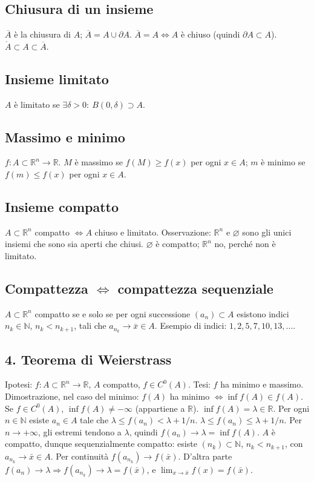 \documentclass[11pt,a4paper]{article}
\newcommand{\R}{\mathbb R}\newcommand{\N}{\mathbb N}\newcommand{\pagina}[1]{\clearpage}
\begin{document}
\subsection*{Chiusura di un insieme}
$\overline A$ è la chiusura di $A$; $\overline A=A\cup\partial A$.
$\overline A=A\iff A$ è chiuso (quindi $\partial A\subset A$).
$\mathring A\subset A\subset\overline A$.
\subsection*{Insieme limitato}
$A$ è limitato se $\exists\delta>0:\ B(0,\delta)\supset A$.
\begin{center}\end{center}
\pagina{16}
\subsection*{Massimo e minimo}
$f:A\subset\R^n\to\R$. $M$ è massimo se $f(M)\ge f(x)$ per ogni $x\in A$; $m$ è minimo se $f(m)\le f(x)$ per ogni $x\in A$.
\subsection*{Insieme compatto}
$A\subset\R^n$ compatto $\iff A$ chiuso e limitato.
Osservazione: $\R^n$ e $\varnothing$ sono gli unici insiemi che sono sia aperti che chiusi. $\varnothing$ è compatto; $\R^n$ no, perché non è limitato.
\subsection*{Compattezza $\iff$ compattezza sequenziale}
$A\subset\R^n$ compatto se e solo se per ogni successione $(a_n)\subset A$ esistono indici $n_k\in\N$, $n_k<n_{k+1}$, tali che $a_{n_k}\to\bar x\in A$. Esempio di indici: $1,2,5,7,10,13,\ldots$.
\subsection*{4. Teorema di Weierstrass}
Ipotesi: $f:A\subset\R^n\to\R$, $A$ compatto, $f\in C^0(A)$. Tesi: $f$ ha minimo e massimo.
Dimostrazione, nel caso del minimo: $f(A)$ ha minimo $\iff\inf f(A)\in f(A)$.
Se $f\in C^0(A)$, $\inf f(A)\ne-\infty$ (appartiene a $\R$).
$\inf f(A)=\lambda\in\R$. Per ogni $n\in\N$ esiste $a_n\in A$ tale che $\lambda\le f(a_n)<\lambda+1/n$.
\pagina{17}
$\lambda\le f(a_n)\le\lambda+1/n$. Per $n\to+\infty$, gli estremi tendono a $\lambda$, quindi $f(a_n)\to\lambda=\inf f(A)$.
$A$ è compatto, dunque sequenzialmente compatto: esiste $(n_k)\subset\N$, $n_k<n_{k+1}$, con $a_{n_k}\to\bar x\in A$.
Per continuità $f(a_{n_k})\to f(\bar x)$. D'altra parte $f(a_n)\to\lambda\Rightarrow f(a_{n_k})\to\lambda=f(\bar x)$, e $\lim_{x\to\bar x}f(x)=f(\bar x)$.
\end{document}

